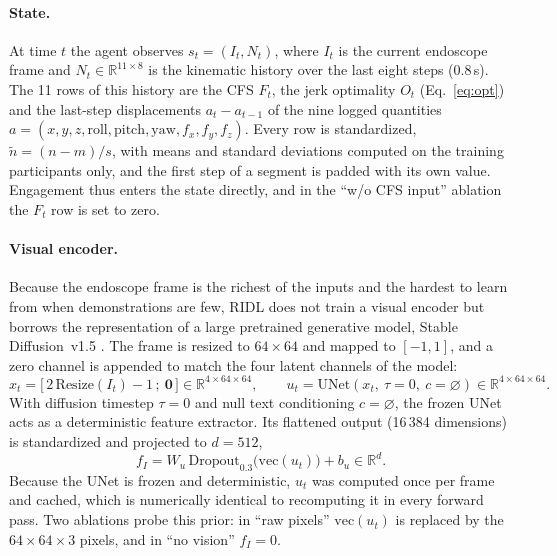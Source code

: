 \documentclass[utf8]{frontiers_suppmat}
\begin{document}
\paragraph*{State.} At time $t$ the agent observes $s_t=(I_t,N_t)$, where $I_t$ is the current endoscope frame and $N_t\in\mathbb R^{11\times8}$ is the kinematic history over the last eight steps (0.8\,s). The 11 rows of this history are the CFS $F_t$, the jerk optimality $O_t$ (Eq.~\ref{eq:opt}) and the last-step displacements $a_t-a_{t-1}$ of the nine logged quantities $a=(x,y,z,\mathrm{roll},\mathrm{pitch},\mathrm{yaw},f_x,f_y,f_z)$. Every row is standardized, $\tilde n=(n-m)/s$, with means and standard deviations computed on the training participants only, and the first step of a segment is padded with its own value. Engagement thus enters the state directly, and in the ``w/o CFS input'' ablation the $F_t$ row is set to zero.

\paragraph*{Visual encoder.} Because the endoscope frame is the richest of the inputs and the hardest to learn from when demonstrations are few, RIDL does not train a visual encoder but borrows the representation of a large pretrained generative model, Stable Diffusion~v1.5 \cite{rombach2022highresolution}. The frame is resized to $64\times64$ and mapped to $[-1,1]$, and a zero channel is appended to match the four latent channels of the model:
\begin{equation}\label{eq:unet}
x_t=\big[\,2\,\mathrm{Resize}(I_t)-1\,;\ \mathbf 0\,\big]\in\mathbb R^{4\times64\times64},\qquad u_t=\mathrm{UNet}(x_t,\ \tau=0,\ c=\varnothing)\in\mathbb R^{4\times64\times64}.
\end{equation}
With diffusion timestep $\tau=0$ and null text conditioning $c=\varnothing$, the frozen UNet acts as a deterministic feature extractor. Its flattened output (16\,384 dimensions) is standardized and projected to $d=512$,
\begin{equation}\label{eq:fi}
f_I=W_u\,\mathrm{Dropout}_{0.3}\big(\mathrm{vec}(u_t)\big)+b_u\in\mathbb R^{d}.
\end{equation}
Because the UNet is frozen and deterministic, $u_t$ was computed once per frame and cached, which is numerically identical to recomputing it in every forward pass. Two ablations probe this prior: in ``raw pixels'' $\mathrm{vec}(u_t)$ is replaced by the $64\times64\times3$ pixels, and in ``no vision'' $f_I=0$.
\end{document}
